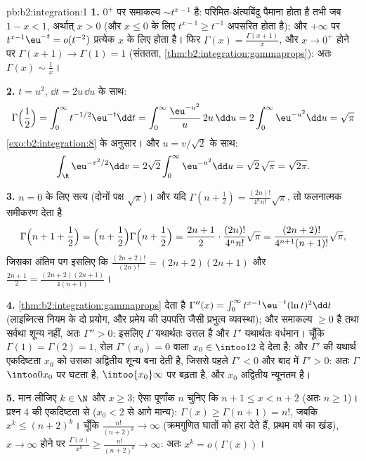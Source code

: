 \begin{solution}{pb:b2:integration:1}
\textbf{1.} $0^+$ पर समाकल्य $\sim t^{x-1}$ है: परिमित-अंत्यबिंदु पैमाना  होता
है तभी जब $1 - x < 1$, अर्थात् $x > 0$ (और $x \leq 0$ के लिए $t^{x-1} \geq t^{-1}$ अपसरित होता है); और $+\infty$ पर
$t^{x-1}\eu^{-t} = o(t^{-2})$ प्रत्येक $x$ के लिए  होता है। फिर $\Gamma(x) = \frac{\Gamma(x+1)}{x}$, और $x \to 0^+$ होने पर $\Gamma(x+1)
\to \Gamma(1) = 1$
(संततता, \cref{thm:b2:integration:gammaprops}): अतः $\Gamma(x) \sim
\frac1x$।

\textbf{2.} $t = u^2$, $\dd t = 2u\,\dd u$ के साथ:
\[
\Gamma\Bigl(\frac12\Bigr) = \int_0^\infty
t^{-1/2}\eu^{-t}\dd t
= \int_0^\infty \frac{\eu^{-u^2}}{u}\,2u\,\dd u
= 2\int_0^\infty \eu^{-u^2}\dd u = \sqrt\pi
\]
\cref{exo:b2:integration:8} के अनुसार। और $u = v/\sqrt2$ के साथ:
\[
\int_\R \eu^{-v^2/2}\dd v
= 2\sqrt2\int_0^\infty \eu^{-u^2}\dd u
= \sqrt2\,\sqrt\pi = \sqrt{2\pi} .
\]

\textbf{3.} $n = 0$ के लिए सत्य (दोनों पक्ष $\sqrt\pi$)। और यदि $\Gamma(n + \frac12) = \frac{(2n)!}{4^n n!}\sqrt\pi$, तो फलनात्मक
समीकरण देता है
\[
\Gamma\Bigl(n + 1 + \frac12\Bigr)
= \Bigl(n + \frac12\Bigr)\Gamma\Bigl(n + \frac12\Bigr)
= \frac{2n+1}{2}\cdot\frac{(2n)!}{4^n n!}\sqrt\pi
= \frac{(2n+2)!}{4^{n+1}(n+1)!}\sqrt\pi ,
\]
जिसका अंतिम पग इसलिए कि $\frac{(2n+2)!}{(2n)!} = (2n+2)(2n+1)$ और $\frac{2n+1}{2} = \frac{(2n+2)(2n+1)}{4(n+1)}$।

\textbf{4.} \cref{thm:b2:integration:gammaprops} देता है
$\Gamma''(x) = \int_0^\infty t^{x-1}\eu^{-t}(\ln t)^2\dd t$
(लाइब्नित्स नियम के दो प्रयोग, और प्रमेय की उपपत्ति जैसी प्रभुत्व
व्यवस्था); और समाकल्य $\geq 0$ है तथा सर्वथा शून्य नहीं, अतः $\Gamma'' > 0$: इसलिए $\Gamma$
यथार्थतः उत्तल है और $\Gamma'$ यथार्थतः वर्धमान। चूँकि $\Gamma(1) = \Gamma(2)
= 1$, रोल $\Gamma'(x_0) =
0$ वाला $x_0 \in \intoo12$
दे देता है; और $\Gamma'$ की यथार्थ एकदिष्टता $x_0$ को उसका अद्वितीय शून्य बना
देती है, जिससे पहले $\Gamma' < 0$ और बाद में $\Gamma' > 0$: अतः $\Gamma$ $\intoo0{x_0}$ पर घटता है, $\intoo{x_0}\infty$
पर बढ़ता है, और $x_0$ अद्वितीय न्यूनतम है।

\textbf{5.} मान लीजिए $k \in \N$ और $x \geq 3$; ऐसा पूर्णांक $n$ चुनिए कि $n + 1 \leq x < n + 2$ (अतः
$n \geq 1$)। प्रश्न 4 की एकदिष्टता से ($x_0 < 2$ से आगे मान्य): $\Gamma(x)
\geq \Gamma(n + 1) = n!$, जबकि $x^k \leq (n+2)^k$। चूँकि
$\frac{n!}{(n+2)^k} \to \infty$ (क्रमगुणित घातों को हरा देते हैं, प्रथम वर्ष का खंड), $x \to \infty$ होने पर
$\frac{\Gamma(x)}{x^k} \geq \frac{n!}{(n+2)^k} \to
\infty$: अतः $x^k = o(\Gamma(x))$।


\end{solution}
